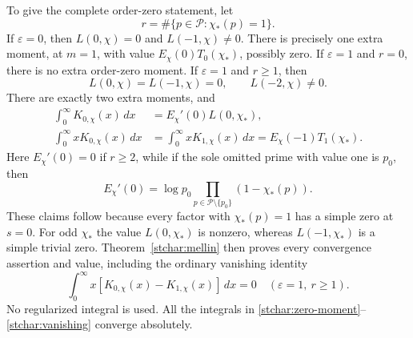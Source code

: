 To give the complete order-zero statement, let
\[
 r=\#\{p\in\mathcal P:\chi_*(p)=1\}.
\]
If $\varepsilon=0$, then $L(0,\chi)=0$ and $L(-1,\chi)\ne0$.
There is precisely one extra moment, at $m=1$, with value
$E_\chi(0)T_0(\chi_*)$, possibly zero.  If $\varepsilon=1$ and
$r=0$, there is no extra order-zero moment.  If $\varepsilon=1$
and $r\ge1$, then
\begin{equation}\label{stchar:odd-block}
 L(0,\chi)=L(-1,\chi)=0,\qquad L(-2,\chi)\ne0.
\end{equation}
There are exactly two extra moments, and
\begin{align}
 \int_0^\infty K_{0,\chi}(x)\,dx
    &=E_\chi'(0)L(0,\chi_*),\label{stchar:zero-moment}\\
 \int_0^\infty xK_{0,\chi}(x)\,dx
    &=\int_0^\infty xK_{1,\chi}(x)\,dx
      =E_\chi(-1)T_1(\chi_*).\label{stchar:first-moment}
\end{align}
Here $E_\chi'(0)=0$ if $r\ge2$, while if the sole omitted prime
with value one is $p_0$, then
\[
 E_\chi'(0)=\log p_0
       \prod_{p\in\mathcal P\setminus\{p_0\}}(1-\chi_*(p)).
\]
These claims follow because every factor with $\chi_*(p)=1$
has a simple zero at $s=0$.  For odd $\chi_*$ the value
$L(0,\chi_*)$ is nonzero, whereas $L(-1,\chi_*)$ is a simple
trivial zero.  Theorem~\ref{stchar:mellin} then proves every
convergence assertion and value, including the ordinary vanishing identity
\begin{equation}\label{stchar:vanishing}
 \boxed{\displaystyle\int_0^\infty x
       [K_{0,\chi}(x)-K_{1,\chi}(x)]\,dx=0
       \quad(\varepsilon=1,\ r\ge1).}
\end{equation}
No regularized integral is used.  All the integrals in
\eqref{stchar:zero-moment}--\eqref{stchar:vanishing} converge absolutely.


